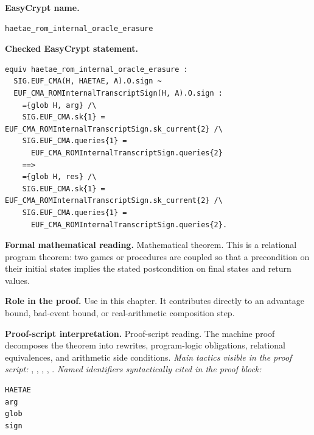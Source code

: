 \begin{formaltheorem}
\noindent\textbf{EasyCrypt name.}
\begin{lstlisting}[language=EasyCrypt,basicstyle=\ttfamily\scriptsize]
haetae_rom_internal_oracle_erasure
\end{lstlisting}
\noindent\textbf{Checked EasyCrypt statement.}
\begin{lstlisting}[language=EasyCrypt,basicstyle=\ttfamily\scriptsize]
equiv haetae_rom_internal_oracle_erasure :
  SIG.EUF_CMA(H, HAETAE, A).O.sign ~
  EUF_CMA_ROMInternalTranscriptSign(H, A).O.sign :
    ={glob H, arg} /\
    SIG.EUF_CMA.sk{1} = EUF_CMA_ROMInternalTranscriptSign.sk_current{2} /\
    SIG.EUF_CMA.queries{1} =
      EUF_CMA_ROMInternalTranscriptSign.queries{2}
    ==>
    ={glob H, res} /\
    SIG.EUF_CMA.sk{1} = EUF_CMA_ROMInternalTranscriptSign.sk_current{2} /\
    SIG.EUF_CMA.queries{1} =
      EUF_CMA_ROMInternalTranscriptSign.queries{2}.
\end{lstlisting}
\noindent\textbf{Formal mathematical reading.}
Mathematical theorem. This is a relational program theorem: two games or procedures are coupled so that a precondition on their initial states implies the stated postcondition on final states and return values.

\noindent\textbf{Role in the proof.}
Use in this chapter. It contributes directly to an advantage bound, bad-event bound, or real-arithmetic composition step.

\noindent\textbf{Proof-script interpretation.}
Proof-script reading. The machine proof decomposes the theorem into rewrites, program-logic obligations, relational equivalences, and arithmetic side conditions.
\emph{Main tactics visible in the proof script:} \ec{proc}, \ec{inline}, \ec{wp}, \ec{call}, \ec{rnd}.
\emph{Named identifiers syntactically cited in the proof block:}
\begin{lstlisting}[language=EasyCrypt,basicstyle=\ttfamily\scriptsize]
HAETAE
arg
glob
sign
\end{lstlisting}

\end{formaltheorem}

